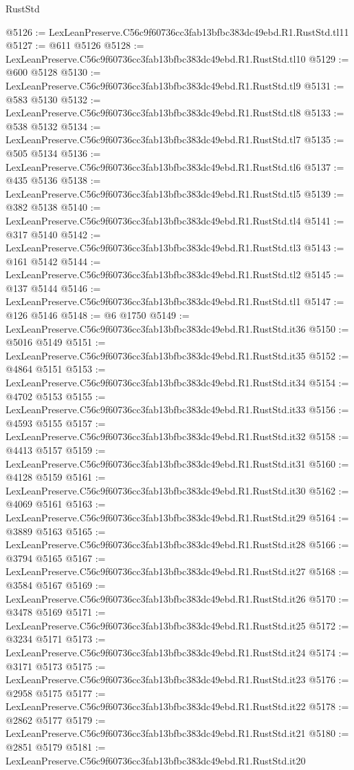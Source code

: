 \begin{lexlean}{RustStd}
\begin{coremodule}
@5126 := LexLeanPreserve.C56c9f60736cc3fab13bfbc383dc49ebd.R1.RustStd.tl11
@5127 := @611 @5126
@5128 := LexLeanPreserve.C56c9f60736cc3fab13bfbc383dc49ebd.R1.RustStd.tl10
@5129 := @600 @5128
@5130 := LexLeanPreserve.C56c9f60736cc3fab13bfbc383dc49ebd.R1.RustStd.tl9
@5131 := @583 @5130
@5132 := LexLeanPreserve.C56c9f60736cc3fab13bfbc383dc49ebd.R1.RustStd.tl8
@5133 := @538 @5132
@5134 := LexLeanPreserve.C56c9f60736cc3fab13bfbc383dc49ebd.R1.RustStd.tl7
@5135 := @505 @5134
@5136 := LexLeanPreserve.C56c9f60736cc3fab13bfbc383dc49ebd.R1.RustStd.tl6
@5137 := @435 @5136
@5138 := LexLeanPreserve.C56c9f60736cc3fab13bfbc383dc49ebd.R1.RustStd.tl5
@5139 := @382 @5138
@5140 := LexLeanPreserve.C56c9f60736cc3fab13bfbc383dc49ebd.R1.RustStd.tl4
@5141 := @317 @5140
@5142 := LexLeanPreserve.C56c9f60736cc3fab13bfbc383dc49ebd.R1.RustStd.tl3
@5143 := @161 @5142
@5144 := LexLeanPreserve.C56c9f60736cc3fab13bfbc383dc49ebd.R1.RustStd.tl2
@5145 := @137 @5144
@5146 := LexLeanPreserve.C56c9f60736cc3fab13bfbc383dc49ebd.R1.RustStd.tl1
@5147 := @126 @5146
@5148 := @6 @1750
@5149 := LexLeanPreserve.C56c9f60736cc3fab13bfbc383dc49ebd.R1.RustStd.it36
@5150 := @5016 @5149
@5151 := LexLeanPreserve.C56c9f60736cc3fab13bfbc383dc49ebd.R1.RustStd.it35
@5152 := @4864 @5151
@5153 := LexLeanPreserve.C56c9f60736cc3fab13bfbc383dc49ebd.R1.RustStd.it34
@5154 := @4702 @5153
@5155 := LexLeanPreserve.C56c9f60736cc3fab13bfbc383dc49ebd.R1.RustStd.it33
@5156 := @4593 @5155
@5157 := LexLeanPreserve.C56c9f60736cc3fab13bfbc383dc49ebd.R1.RustStd.it32
@5158 := @4413 @5157
@5159 := LexLeanPreserve.C56c9f60736cc3fab13bfbc383dc49ebd.R1.RustStd.it31
@5160 := @4128 @5159
@5161 := LexLeanPreserve.C56c9f60736cc3fab13bfbc383dc49ebd.R1.RustStd.it30
@5162 := @4069 @5161
@5163 := LexLeanPreserve.C56c9f60736cc3fab13bfbc383dc49ebd.R1.RustStd.it29
@5164 := @3889 @5163
@5165 := LexLeanPreserve.C56c9f60736cc3fab13bfbc383dc49ebd.R1.RustStd.it28
@5166 := @3794 @5165
@5167 := LexLeanPreserve.C56c9f60736cc3fab13bfbc383dc49ebd.R1.RustStd.it27
@5168 := @3584 @5167
@5169 := LexLeanPreserve.C56c9f60736cc3fab13bfbc383dc49ebd.R1.RustStd.it26
@5170 := @3478 @5169
@5171 := LexLeanPreserve.C56c9f60736cc3fab13bfbc383dc49ebd.R1.RustStd.it25
@5172 := @3234 @5171
@5173 := LexLeanPreserve.C56c9f60736cc3fab13bfbc383dc49ebd.R1.RustStd.it24
@5174 := @3171 @5173
@5175 := LexLeanPreserve.C56c9f60736cc3fab13bfbc383dc49ebd.R1.RustStd.it23
@5176 := @2958 @5175
@5177 := LexLeanPreserve.C56c9f60736cc3fab13bfbc383dc49ebd.R1.RustStd.it22
@5178 := @2862 @5177
@5179 := LexLeanPreserve.C56c9f60736cc3fab13bfbc383dc49ebd.R1.RustStd.it21
@5180 := @2851 @5179
@5181 := LexLeanPreserve.C56c9f60736cc3fab13bfbc383dc49ebd.R1.RustStd.it20

\end{coremodule}
\end{lexlean}
